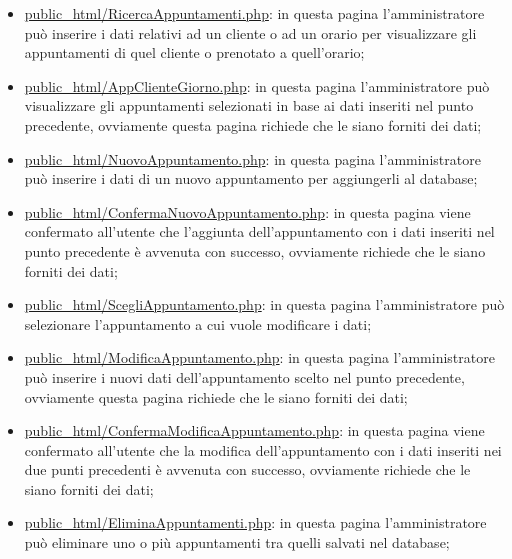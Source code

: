 {\begin{itemize}
		\item \href{http://tecnologie-web.studenti.math.unipd.it/tecweb/~pgabelli/public\_html/RicercaAppuntamenti.php}{public\_html/RicercaAppuntamenti.php}: in questa pagina l'amministratore può inserire i dati relativi ad un cliente o ad un orario per visualizzare gli appuntamenti di quel cliente o prenotato a quell'orario;
		\item \href{http://tecnologie-web.studenti.math.unipd.it/tecweb/~pgabelli/public\_html/AppClienteGiorno.php}{public\_html/AppClienteGiorno.php}: in questa pagina l'amministratore può visualizzare gli appuntamenti selezionati in base ai dati inseriti nel punto precedente, ovviamente questa pagina richiede che le siano forniti dei dati;
		\item \href{http://tecnologie-web.studenti.math.unipd.it/tecweb/~pgabelli/public\_html/NuovoAppuntamento.php}{public\_html/NuovoAppuntamento.php}: in questa pagina l'amministratore può inserire i dati di un nuovo appuntamento per aggiungerli al database;
		\item \href{http://tecnologie-web.studenti.math.unipd.it/tecweb/~pgabelli/public\_html/ConfermaNuovoAppuntamento.php}{public\_html/ConfermaNuovoAppuntamento.php}: in questa pagina viene confermato all'utente che l'aggiunta dell'appuntamento con i dati inseriti nel punto precedente è avvenuta con successo, ovviamente richiede che le siano forniti dei dati;
		\item \href{http://tecnologie-web.studenti.math.unipd.it/tecweb/~pgabelli/public\_html/ScegliAppuntamento.php}{public\_html/ScegliAppuntamento.php}: in questa pagina l'amministratore può selezionare l'appuntamento a cui vuole modificare i dati;
		\item \href{http://tecnologie-web.studenti.math.unipd.it/tecweb/~pgabelli/public\_html/ModificaAppuntamento.php}{public\_html/ModificaAppuntamento.php}: in questa pagina l'amministratore può inserire i nuovi dati dell'appuntamento scelto nel punto precedente, ovviamente questa pagina richiede che le siano forniti dei dati;
		\item \href{http://tecnologie-web.studenti.math.unipd.it/tecweb/~pgabelli/public\_html/ConfermaModificaAppuntamento.php}{public\_html/ConfermaModificaAppuntamento.php}: in questa pagina viene confermato all'utente che la modifica dell'appuntamento con i dati inseriti nei due punti precedenti è avvenuta con successo, ovviamente richiede che le siano forniti dei dati;
		\item \href{http://tecnologie-web.studenti.math.unipd.it/tecweb/~pgabelli/public\_html/EliminaAppuntamenti.php}{public\_html/EliminaAppuntamenti.php}: in questa pagina l'amministratore può eliminare uno o più appuntamenti tra quelli salvati nel database;

\end{itemize}}
